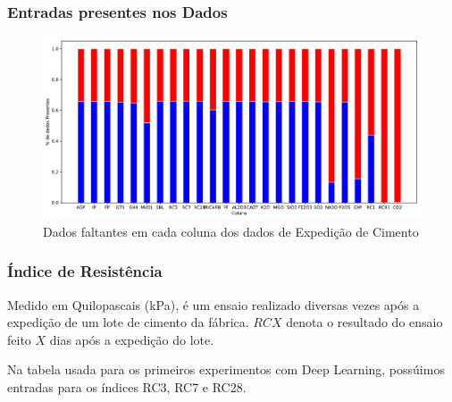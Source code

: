\documentclass{beamer}
\begin{document}
\begin{frame}
  \frametitle{Entradas presentes nos Dados}
\begin{figure}[H]
\centering
\includegraphics[scale=0.3]{slides_dados_pct}
\caption{Dados faltantes em cada coluna dos dados de Expedição de Cimento}
\end{figure}

\end{frame}


\begin{frame}
  \frametitle{Índice de Resistência}
Medido em Quilopascais (kPa), é um ensaio realizado diversas vezes após a
expedição de um lote de cimento da fábrica. $RCX$ denota o resultado do ensaio feito $X$ dias
após a expedição do lote. \\
\bigskip

Na tabela usada para os primeiros experimentos com Deep Learning, possúimos
entradas para os índices RC3, RC7 e RC28. \\

  
\end{frame}
\end{document}
